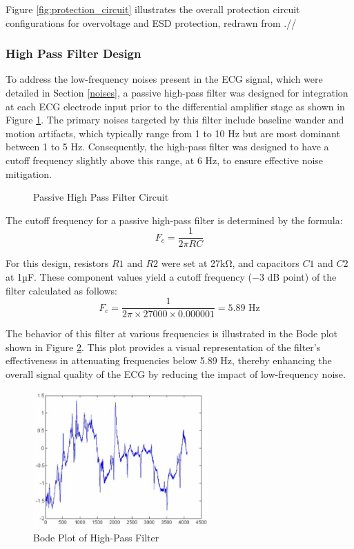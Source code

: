 \noindent Figure \ref{fig:protection_circuit} illustrates the overall protection circuit configurations for overvoltage and ESD protection, redrawn from \cite{TI_SLVA898}.//

\subsubsection{High Pass Filter Design}
\vspace{1em}
To address the low-frequency noises present in the ECG signal, which were detailed in Section \ref{noises}, a passive high-pass filter was designed for integration at each ECG electrode input prior to the differential amplifier stage as shown in Figure \ref{fig:high_pass_filter}. The primary noises targeted by this filter include baseline wander and motion artifacts, which typically range from 1 to 10 Hz but are most dominant between 1 to 5 Hz. Consequently, the high-pass filter was designed to have a cutoff frequency slightly above this range, at 6 Hz, to ensure effective noise mitigation.

\begin{figure}[h]
	\centering
	
	\caption{Passive High Pass Filter Circuit}
	\label{fig:high_pass_filter}
\end{figure}

\noindent The cutoff frequency for a passive high-pass filter is determined by the formula:
\[ F_c = \frac{1}{2\pi RC} \]

\noindent For this design, resistors \( R1 \) and \( R2 \) were set at 27kΩ, and capacitors \( C1 \) and \( C2 \) at 1µF. These component values yield a cutoff frequency (\(-3\) dB point) of the filter calculated as follows:
\[ F_c = \frac{1}{2\pi \times 27000 \times 0.000001} = 5.89 \text{ Hz} \]

\noindent The behavior of this filter at various frequencies is illustrated in the Bode plot shown in Figure \ref{fig:bode_plot_high_pass}. This plot provides a visual representation of the filter's effectiveness in attenuating frequencies below 5.89 Hz, thereby enhancing the overall signal quality of the ECG by reducing the impact of low-frequency noise.\\

\begin{figure}[h]
	\centering
	\includegraphics[width=0.6\textwidth]{images/motionArtifacts}
	\caption{Bode Plot of High-Pass Filter}
	\label{fig:bode_plot_high_pass}
\end{figure}


